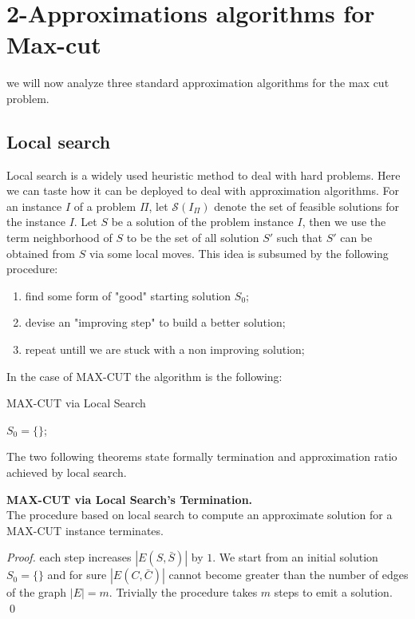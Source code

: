 \section{2-Approximations algorithms for Max-cut}
we will now analyze three standard approximation algorithms for the max cut problem.

\subsection{Local search}
Local search is a widely used heuristic method to deal with hard problems.
Here we can taste how it can be deployed to deal with approximation algorithms.
For an instance $I$ of a problem $ \Pi $, let $\mathcal{S}(I_{\Pi})$ denote the set of feasible solutions for the instance $I$.
Let $S$ be a solution of the problem instance $I$, then we use the term neighborhood of $S$ to be  the  set  of  all solution $S'$ such that $S'$ can be obtained from $S$ via some local moves.
This idea is subsumed by the following procedure:
\begin{enumerate}
  \item find some form of "good" starting solution $S_0$;
  \item devise an "improving step" to build a better solution;
  \item repeat untill we are stuck with a non improving solution;
\end{enumerate}

In the case of MAX-CUT the algorithm is the following:

\begin{algorithm}[H]
\SetAlgoLined
{}
\caption{MAX-CUT via Local Search}
$S_0 =\{\}$;\\
{
}
\end{algorithm}
\bigskip

The two following theorems state formally termination and approximation ratio achieved by local search.

\begin{theorem}{\textbf{MAX-CUT via Local Search's Termination.}} 
\\
 The procedure based on local search to compute an approximate solution for a MAX-CUT instance terminates.
\end{theorem}
\begin{proof}
  each step increases $|E(S,\bar{S})|$ by $1$. We start from an initial solution $ S_0 = \{\} $ and for sure $|E(C,\bar{C})|$ cannot become greater than the number of edges of the graph $ |E| = m $.
  Trivially the procedure takes $m$ steps to emit a solution.
  \qed
\end{proof}

